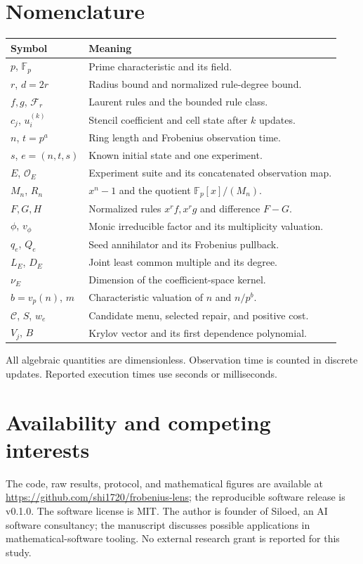 \documentclass{ijuc}
\begin{document}
\section*{Nomenclature}
\begin{center}\small
\begin{tabular}{@{}p{.20\linewidth}p{.73\linewidth}@{}}
\toprule
Symbol & Meaning\\\midrule
$p$, $\mathbb F_p$ & Prime characteristic and its field.\\
$r$, $d=2r$ & Radius bound and normalized rule-degree bound.\\
$f,g$, $\mathcal F_r$ & Laurent rules and the bounded rule class.\\
$c_j$, $u_i^{(k)}$ & Stencil coefficient and cell state after $k$ updates.\\
$n$, $t=p^a$ & Ring length and Frobenius observation time.\\
$s$, $e=(n,t,s)$ & Known initial state and one experiment.\\
$E$, $\mathcal O_E$ & Experiment suite and its concatenated observation map.\\
$M_n$, $R_n$ & $x^n-1$ and the quotient $\mathbb F_p[x]/(M_n)$.\\
$F,G,H$ & Normalized rules $x^rf,x^rg$ and difference $F-G$.\\
$\phi$, $v_\phi$ & Monic irreducible factor and its multiplicity valuation.\\
$q_e$, $Q_e$ & Seed annihilator and its Frobenius pullback.\\
$L_E$, $D_E$ & Joint least common multiple and its degree.\\
$\nu_E$ & Dimension of the coefficient-space kernel.\\
$b=v_p(n)$, $m$ & Characteristic valuation of $n$ and $n/p^b$.\\
$\mathcal C$, $S$, $w_e$ & Candidate menu, selected repair, and positive cost.\\
$V_j$, $B$ & Krylov vector and its first dependence polynomial.\\
\bottomrule
\end{tabular}
\end{center}
All algebraic quantities are dimensionless. Observation time is counted in discrete updates. Reported execution times use seconds or milliseconds.

\section*{Availability and competing interests}
The code, raw results, protocol, and mathematical figures are available at \url{https://github.com/shi1720/frobenius-lens}; the reproducible software release is v0.1.0. The software license is MIT. The author is founder of Siloed, an AI software consultancy; the manuscript discusses possible applications in mathematical-software tooling. No external research grant is reported for this study.


\end{document}
